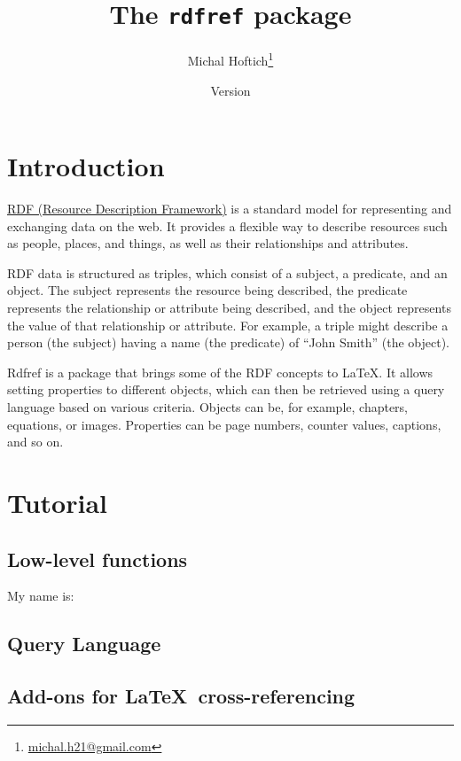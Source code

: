 \documentclass{ltxdoc}
\title{The \texttt{rdfref} package}
\author{Michal Hoftich\footnote{\url{michal.h21@gmail.com}}}
\date{Version \version\\\gitdate}
\begin{document}
\maketitle
\tableofcontents

\section{Introduction}

\href{https://en.wikipedia.org/wiki/Resource_Description_Framework}{RDF (Resource Description Framework)}
is a standard model for representing and
exchanging data on the web. It provides a flexible way to describe resources
such as people, places, and things, as well as their relationships and
attributes.

RDF data is structured as triples, which consist of a subject, a predicate, and
an object. The subject represents the resource being described, the predicate
represents the relationship or attribute being described, and the object
represents the value of that relationship or attribute. For example, a triple
might describe a person (the subject) having a name (the predicate) of \enquote{John
Smith} (the object).

Rdfref is a package that brings some of the RDF concepts to \LaTeX. It allows
setting properties to different objects, which can then be retrieved using a
query language based on various criteria. Objects can be, for example,
chapters, equations, or images. Properties can be page numbers, counter values,
captions, and so on.


\section{Tutorial}

\subsection{Low-level functions}

\begin{LTXexample}
  My name is: 

\end{LTXexample}

\subsection{Query Language}

\subsection{Add-ons for \LaTeX\ cross-referencing}
\end{document}
